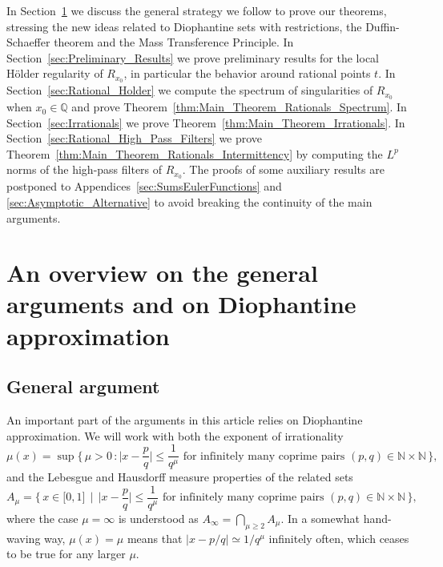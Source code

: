 \documentclass[11pt,reqno]{amsart}
\theoremstyle{definition}
\begin{document}
In Section~\ref{sec:Diophantine_Approximation} we discuss the  general strategy we follow to prove our theorems, stressing the new ideas related to Diophantine sets with restrictions, the Duffin-Schaeffer theorem and the Mass Transference Principle. 
In Section~\ref{sec:Preliminary_Results} we prove 
 preliminary results for the local H\"older regularity of $R_{x_0}$, 
 in particular the behavior around rational points $t$.
In Section~\ref{sec:Rational_Holder} we compute the spectrum of singularities of $R_{x_0}$ when $x_0 \in \mathbb Q$ and prove Theorem~\ref{thm:Main_Theorem_Rationals_Spectrum}. 
In Section~\ref{sec:Irrationals} we prove Theorem~\ref{thm:Main_Theorem_Irrationals}. 
In Section~\ref{sec:Rational_High_Pass_Filters}
we prove Theorem~\ref{thm:Main_Theorem_Rationals_Intermittency} 
by computing the $L^p$ norms of the high-pass filters of $R_{x_0}$. 
The proofs of some auxiliary results are postponed to Appendices~\ref{sec:SumsEulerFunctions} and \ref{sec:Asymptotic_Alternative} to avoid breaking the continuity of the main arguments. 







\section{An overview on the general arguments and on Diophantine approximation}\label{sec:Diophantine_Approximation}


\subsection{General argument} 
An important part of the arguments in this article relies on Diophantine approximation.
We will work with both the exponent of irrationality 
\begin{equation}\label{eq:Exponent_Of_Irrationality}
\mu(x) = \sup \Big\{ \, \mu > 0 \, : \Big| x - \frac{p}{q} \Big| \leq \frac{1}{q^\mu} \text{ for infinitely many coprime pairs } (p,q) \in \mathbb N \times \mathbb N \,   \Big\}, 
\end{equation}
and the Lebesgue and Hausdorff measure properties of the related sets 
\begin{equation}\label{eq:A_mu_Intro}
A_\mu = \Big\{ \, x \in \mathbb [0,1] \, \mid \, \Big| x - \frac{p}{q} \Big| \leq \frac{1}{q^\mu} \text{ for infinitely many coprime pairs } (p,q) \in \mathbb N \times \mathbb N \,   \Big\}, 
\end{equation}
where the case $\mu = \infty$ is understood as $A_\infty = \bigcap_{\mu \geq 2} A_\mu$. 
In a somewhat hand-waving way, $\mu(x) = \mu$ 
means that $|x - p/q| \simeq 1/q^\mu$ infinitely often, which ceases to be true for any larger $\mu$. 
\end{document}
